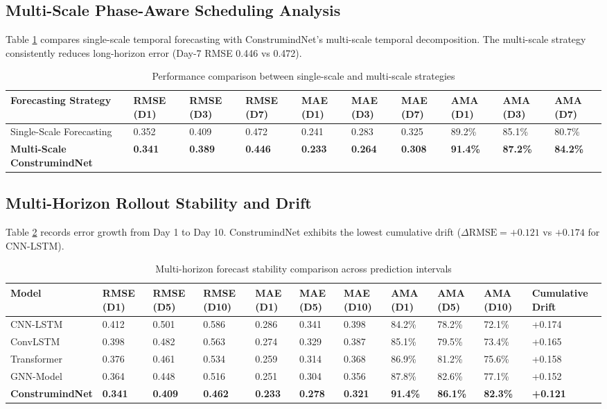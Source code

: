 \documentclass[pdflatex,sn-mathphys,Numbered]{sn-jnl}%
\begin{document}
\subsection{Multi-Scale Phase-Aware Scheduling Analysis}
Table \ref{tab8} compares single-scale temporal forecasting with ConstrumindNet's multi-scale temporal decomposition. The multi-scale strategy consistently reduces long-horizon error (Day-7 RMSE 0.446 vs 0.472).

\begin{table}[t]
\caption{Performance comparison between single-scale and multi-scale strategies}\label{tab8}
\begin{tabular*}{\textwidth}{@{\extracolsep\fill}llllllllll@{\extracolsep\fill}}
\toprule
Forecasting Strategy & RMSE (D1) & RMSE (D3) & RMSE (D7) & MAE (D1) & MAE (D3) & MAE (D7) & AMA (D1) & AMA (D3) & AMA (D7) \\
\midrule
Single-Scale Forecasting & 0.352 & 0.409 & 0.472 & 0.241 & 0.283 & 0.325 & 89.2\% & 85.1\% & 80.7\% \\
\textbf{Multi-Scale ConstrumindNet} & \textbf{0.341} & \textbf{0.389} & \textbf{0.446} & \textbf{0.233} & \textbf{0.264} & \textbf{0.308} & \textbf{91.4\%} & \textbf{87.2\%} & \textbf{84.2\%} \\
\bottomrule
\end{tabular*}
\end{table}

\subsection{Multi-Horizon Rollout Stability and Drift}
Table \ref{tab9} records error growth from Day 1 to Day 10. ConstrumindNet exhibits the lowest cumulative drift ($\Delta\text{RMSE} = +0.121$ vs $+0.174$ for CNN-LSTM).

\begin{table}[t]
\caption{Multi-horizon forecast stability comparison across prediction intervals}\label{tab9}
\begin{tabular*}{\textwidth}{@{\extracolsep\fill}lllllllllll@{\extracolsep\fill}}
\toprule
Model & RMSE (D1) & RMSE (D5) & RMSE (D10) & MAE (D1) & MAE (D5) & MAE (D10) & AMA (D1) & AMA (D5) & AMA (D10) & Cumulative Drift \\
\midrule
CNN-LSTM & 0.412 & 0.501 & 0.586 & 0.286 & 0.341 & 0.398 & 84.2\% & 78.2\% & 72.1\% & +0.174 \\
ConvLSTM & 0.398 & 0.482 & 0.563 & 0.274 & 0.329 & 0.387 & 85.1\% & 79.5\% & 73.4\% & +0.165 \\
Transformer & 0.376 & 0.461 & 0.534 & 0.259 & 0.314 & 0.368 & 86.9\% & 81.2\% & 75.6\% & +0.158 \\
GNN-Model & 0.364 & 0.448 & 0.516 & 0.251 & 0.304 & 0.356 & 87.8\% & 82.6\% & 77.1\% & +0.152 \\
\textbf{ConstrumindNet} & \textbf{0.341} & \textbf{0.409} & \textbf{0.462} & \textbf{0.233} & \textbf{0.278} & \textbf{0.321} & \textbf{91.4\%} & \textbf{86.1\%} & \textbf{82.3\%} & \textbf{+0.121} \\
\bottomrule
\end{tabular*}
\end{table}
\end{document}
